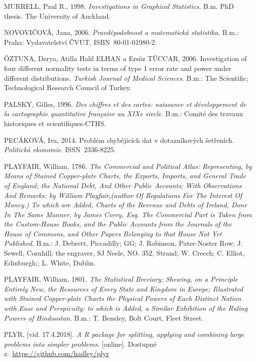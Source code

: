 \documentclass[12pt,]{article}
\begin{document}
\hypertarget{ref-murrell1998}{}
MURRELL, Paul R., 1998. \emph{Investigations in Graphical Statistics}.
B.m. PhD thesis. The University of Auckland.

\hypertarget{ref-novovic2006}{}
NOVOVIČOVÁ, Jana, 2006. \emph{Pravděpodobnost a matematická statistika}.
B.m.: Praha: Vydavatelství ČVUT, ISBN~80-01-01980-2.

\hypertarget{ref-normality_tests}{}
ÖZTUNA, Derya, Atilla Halil ELHAN a Ersöz TÜCCAR, 2006. Investigation of
four different normality tests in terms of type 1 error rate and power
under different distributions. \emph{Turkish Journal of Medical
Sciences}. B.m.: The Scientific; Technological Research Council of
Turkey.

\hypertarget{ref-palsky1996}{}
PALSKY, Gilles, 1996. \emph{Des chiffres et des cartes: naissance et
développement de la cartographie quantitative française au XIXe siecle}.
B.m.: Comité des travaux historiques et scientifiques-CTHS.

\hypertarget{ref-pecakova}{}
PECÁKOVÁ, Iva, 2014. Problém chybějících dat v dotazníkových šetřeních.
\emph{Politická ekonomie}. ISSN~2336-8225.

\hypertarget{ref-playfair1786}{}
PLAYFAIR, William, 1786. \emph{The Commercial and Political Atlas:
Representing, by Means of Stained Copper-plate Charts, the Exports,
Imports, and General Trade of England; the National Debt, And Other
Public Accounts; With Observations And Remarks: by William
Playfair,(author Of Regulations For The Interest Of Money.) To which are
Added, Charts of the Revenue and Debts of Ireland, Done In The Same
Manner, by James Corry, Esq. The Commercial Part is Taken from the
Custom-House Books, and the Public Accounts from the Journals of the
House of Commons, and Other Papers Belonging to that House Not Yet
Published}. B.m.: J. Debrett, Piccadilly; GG; J. Robinson, Pater-Noster
Row; J. Sewell, Cornhill; the engraver, SJ Neele, NO. 352, Strand; W.
Creech; C. Elliot, Edinburgh;; L. White, Dublin.

\hypertarget{ref-playfair1801}{}
PLAYFAIR, William, 1801. \emph{The Statistical Breviary: Shewing, on a
Principle Entirely New, the Resources of Every State and Kingdom in
Europe; Illustrated with Stained Copper-plate Charts the Physical Powers
of Each Distinct Nation with Ease and Perspicuity: to which is Added, a
Similar Exhibition of the Ruling Powers of Hindoostan}. B.m.: T.
Bensley, Bolt Court, Fleet Street.

\hypertarget{ref-plyr}{}
PLYR, {[}vid. 17.4.2018{]}. \emph{A R package for splitting, applying
and combining large problems into simpler problems.} {[}online{]}.
Dostupné z:~\url{https://github.com/hadley/plyr}
\end{document}
